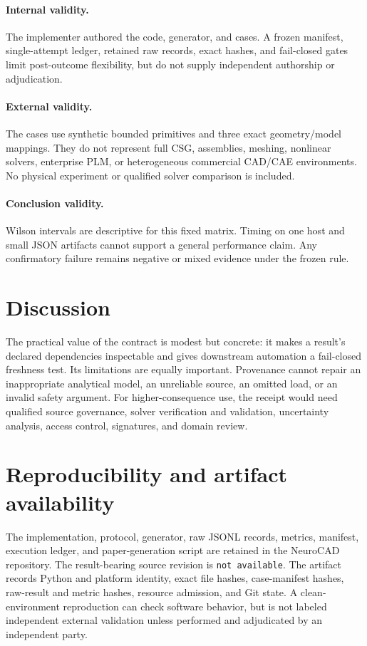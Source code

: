 \documentclass[10pt]{article}
\newcommand{\ResultCommit}{not available}
\begin{document}
\paragraph{Internal validity.}
The implementer authored the code, generator, and cases. A frozen manifest,
single-attempt ledger, retained raw records, exact hashes, and fail-closed gates
limit post-outcome flexibility, but do not supply independent authorship or
adjudication.

\paragraph{External validity.}
The cases use synthetic bounded primitives and three exact geometry/model
mappings. They do not represent full CSG, assemblies, meshing, nonlinear
solvers, enterprise PLM, or heterogeneous commercial CAD/CAE environments.
No physical experiment or qualified solver comparison is included.

\paragraph{Conclusion validity.}
Wilson intervals are descriptive for this fixed matrix. Timing on one host and
small JSON artifacts cannot support a general performance claim. Any
confirmatory failure remains negative or mixed evidence under the frozen rule.

\section{Discussion}

The practical value of the contract is modest but concrete: it makes a result's
declared dependencies inspectable and gives downstream automation a fail-closed
freshness test. Its limitations are equally important. Provenance cannot repair
an inappropriate analytical model, an unreliable source, an omitted load, or
an invalid safety argument. For higher-consequence use, the receipt would need
qualified source governance, solver verification and validation, uncertainty
analysis, access control, signatures, and domain review.

\section{Reproducibility and artifact availability}

The implementation, protocol, generator, raw JSONL records, metrics, manifest,
execution ledger, and paper-generation script are retained in the NeuroCAD
repository. The result-bearing source revision is \texttt{\ResultCommit}. The
artifact records Python and platform identity, exact file hashes, case-manifest
hashes, raw-result and metric hashes, resource admission, and Git state. A
clean-environment reproduction can check software behavior, but is not labeled
independent external validation unless performed and adjudicated by an
independent party.
\end{document}
